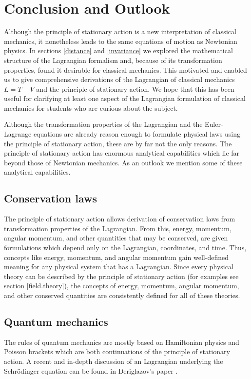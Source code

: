 \documentclass[prb,preprint]{revtex4-1}
\begin{document}
\section{Conclusion and Outlook}

Although the principle of stationary action is a new interpretation of classical mechanics, it nonetheless leads to the same equations of motion as Newtonian physics. In sections \ref{distance} and \ref{invariance} we explored the mathematical structure of the Lagrangian formalism and, because of its transformation properties, found it desirable for classical mechanics. This motivated and enabled us to give comprehensive derivations of the Lagrangian of classical mechanics $L=T-V$ and the principle of stationary action. We hope that this has been useful for clarifying at least one aspect of the Lagrangian formulation of classical mechanics for students who are curious about the subject.


Although the transformation properties of the Lagrangian and the Euler-Lagrange equations are already reason enough to formulate physical laws using the principle of stationary action, these are by far not the only reasons. The principle of stationary action has enormous analytical capabilities which lie far beyond those of Newtonian mechanics. As an outlook we mention some of these analytical capabilities.

\subsection{Conservation laws \cite{KleinertConservation}}
The principle of stationary action allows derivation of conservation laws from transformation properties of the Lagrangian. From this, energy, momentum, angular momentum, and other quantities that may be conserved, are given formulations which depend only on the Lagrangian, coordinates, and time. Thus, concepts like energy, momentum, and angular momentum gain well-defined meaning for any physical system that has a Lagrangian. Since every physical theory can be described by the principle of stationary action (for examples see section \ref{field.theory}), the concepts of energy, momentum, angular momentum, and other conserved quantities are consistently defined for all of these theories.

\subsection{Quantum mechanics \cite{Schwabl}}
The rules of quantum mechanics are mostly based on Hamiltonian physics and Poisson brackets which are both continuations of the principle of stationary action. A recent and in-depth discussion of an Lagrangian underlying the Schr{\"o}dinger equation can be found in Deriglazov's paper \cite{Deriglazov}.
\end{document}
